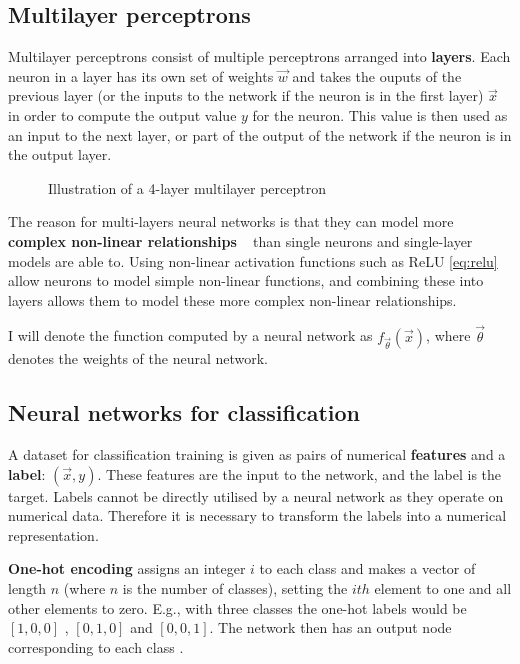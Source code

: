\subsection{Multilayer perceptrons}

Multilayer perceptrons consist of multiple perceptrons arranged into \textbf{layers}. 
Each neuron in a layer has its own set of weights
$\vec{w}$ and takes the ouputs of the previous layer (or the inputs to the network if the neuron is in the first layer) $\vec{x}$ in order to compute the 
output value $y$ for the neuron. This value is then used as an input to the next layer, or part of the output of the network if the neuron is in
the output layer.
\begin{figure}[H]
  \begin{center}
      \scalebox{.65}{}
      \caption{Illustration of a 4-layer multilayer perceptron}
      \label{fig:illustration_deep_network}
  \end{center}
\end{figure}
 
The reason for multi-layers neural networks is that they can model more \textbf{complex non-linear relationships}
~\cite{Goodfellow-et-al-2016} than single 
neurons and single-layer models are able to. Using non-linear activation functions such as ReLU \eqref{eq:relu} allow neurons to model simple 
non-linear functions, and combining these into layers allows them to model these more complex non-linear relationships.

I will denote the function computed by a neural network as $f_{\vec{\theta}}(\vec{x})$, where $\vec{\theta}$ denotes the
weights of the neural network.

\subsection{Neural networks for classification}

A dataset for classification training is given as pairs of numerical \textbf{features} and a \textbf{label}: $(\vec{x}, y)$. These features are 
the input to the network,
and the label is the target. Labels cannot be directly utilised by a neural network as they operate on numerical data. Therefore it is 
necessary to transform the labels into a numerical representation.

\textbf{One-hot encoding} assigns an integer $i$ to each class and makes a vector of length $n$ (where $n$ is the 
number of classes), setting the $ith$ element to one and all other elements to zero. E.g., with three classes
the one-hot labels would be $[1, 0, 0]$ , $[0, 1, 0]$ and $[0, 0, 1]$. The network then has an output node corresponding to each class 
\cite{WhyOneHo55:online}.

